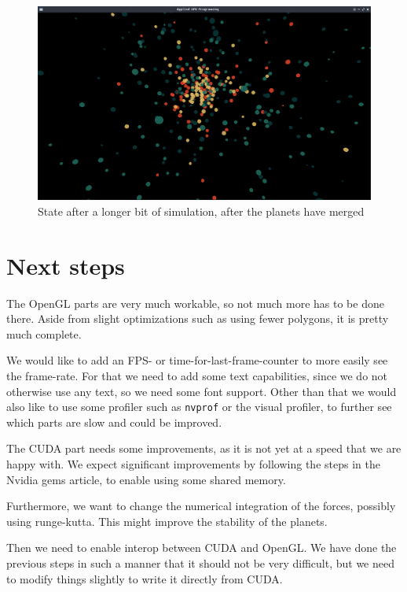 \documentclass[11pt,a4paper,article,oneside]{memoir}
\begin{document}
\begin{figure}[h]
\center
\includegraphics[width=12cm]{img3}
\caption{State after a longer bit of simulation, after the planets have merged}
\end{figure}

\chapter{Next steps}
The OpenGL parts are very much workable, so not much more has to be done there.
Aside from slight optimizations such as using fewer polygons, it is pretty much complete.

We would like to add an FPS- or time-for-last-frame-counter to more easily see the frame-rate.
For that we need to add some text capabilities, since we do not otherwise use any text, so we need some font support.
Other than that we would also like to use some profiler such as \verb|nvprof| or the visual profiler, to further see which parts are slow and could be improved.

The CUDA part needs some improvements, as it is not yet at a speed that we are happy with.
We expect significant improvements by following the steps in the Nvidia gems article, to enable using some shared memory.

Furthermore, we want to change the numerical integration of the forces, possibly using runge-kutta.
This might improve the stability of the planets.

Then we need to enable interop between CUDA and OpenGL.
We have done the previous steps in such a manner that it should not be very difficult, but we need to modify things slightly to write it directly from CUDA.

\end{document}
